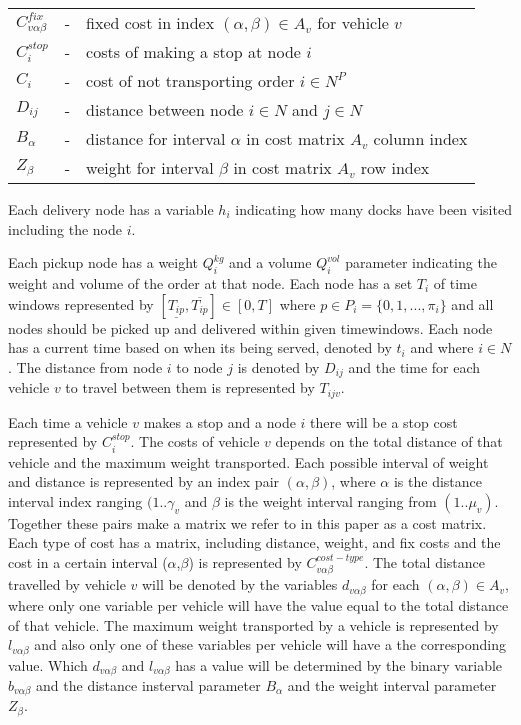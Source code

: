 \documentclass[a4paper,10pt]{article}
\begin{document}
\begin{tabular}{l c l }
    $C^{fix}_{v\alpha\beta} $	&-& fixed cost in index $(\alpha, \beta) \in A_v$ for vehicle $v$	\\
    $C^{stop}_i             $   &-& costs of making a stop at node $i$ 	                        \\
    $C_i                    $   &-& cost of not transporting order $i\in N^P$                   \\
    $D_{ij}	            $   &-& distance between node $i\in N$ and  $j\in N$		\\
    $B_\alpha               $   &-& distance for interval $\alpha$ in cost matrix $A_v$ column index\\
    $Z_\beta                $   &-& weight for interval $\beta$ in cost matrix $A_v$ row index    \\ 
\end{tabular}
\linebreak
\linebreak
\par
Each delivery node has a variable $h_{i}$ indicating how many docks have been visited including the node $i$. \par 
Each pickup node has a weight $Q_i^{kg}$ and a volume $Q_i^{vol}$ parameter indicating the weight and volume of the order at that node.
Each node has a set $T_{i}$ of time windows represented by $[ \underline{T_{ip}},  \overline{T_{ip}} ] \in [0,T]$ where $p \in P_i=\{0,1,...,\pi_i\}$ and all nodes should be picked up and delivered within given timewindows.
Each node has a current time based on when its being served, denoted by $t_{i}$ and where $i \in N$. 
The distance from node $i$ to node $j$ is denoted by $D_{ij}$ and the time for each vehicle $v$ to travel between them is represented by $T_{ijv}$. \par 
Each time a vehicle $v$ makes a stop and a node $i$ there will be a stop cost represented by $C_i^{stop}$. 
The costs of vehicle $v$ depends on the total distance of that vehicle and the maximum weight transported. 
Each possible interval of weight and distance is represented by an index pair $(\alpha,\beta)$, where $\alpha$ is the distance interval index ranging $(1..\gamma_v$ and $\beta$ is the weight interval ranging from $(1..\mu_v)$. 
Together these pairs make a matrix we refer to in this paper as a cost matrix. 
Each type of cost has a matrix, including distance, weight, and fix costs and the cost in a certain interval ($\alpha$,$\beta$) is represented by $C_{v\alpha\beta}^{cost-type}$. 
The total distance travelled by vehicle $v$ will be denoted by the variables $d_{v\alpha\beta}$ for each $(\alpha,\beta)\in A_v$, where only one variable per vehicle will have the value equal to the total distance of that vehicle. 
The maximum weight transported by a vehicle is represented by $l_{v\alpha\beta}$ and also only one of these variables per vehicle will have a the corresponding value.
Which $d_{v\alpha\beta}$ and $l_{v\alpha\beta}$ has a value will be determined by the binary variable $b_{v\alpha\beta}$ and the distance insterval parameter $B_\alpha$ and the weight interval parameter $Z_\beta$.  
\linebreak
\end{document}
